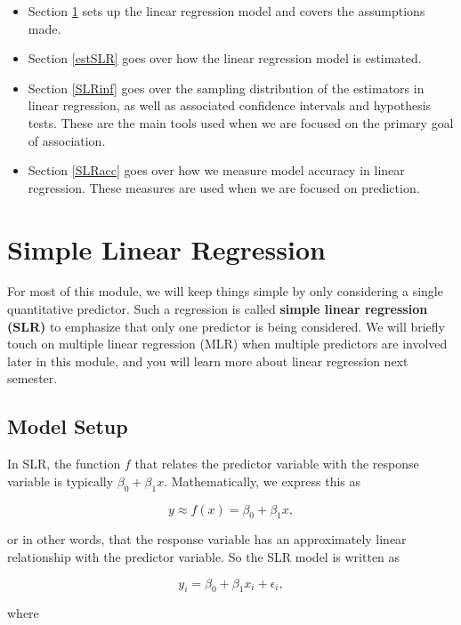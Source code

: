 \documentclass[
]{book}
\providecommand{\tightlist}{%
  \setlength{\itemsep}{0pt}\setlength{\parskip}{0pt}}
\begin{document}
\begin{itemize}
\tightlist
\item
  Section \ref{SLR} sets up the linear regression model and covers the assumptions made.
\item
  Section \ref{estSLR} goes over how the linear regression model is estimated.
\item
  Section \ref{SLRinf} goes over the sampling distribution of the estimators in linear regression, as well as associated confidence intervals and hypothesis tests. These are the main tools used when we are focused on the primary goal of association.
\item
  Section \ref{SLRacc} goes over how we measure model accuracy in linear regression. These measures are used when we are focused on prediction.
\end{itemize}

\hypertarget{SLR}{%
\section{Simple Linear Regression}\label{SLR}}

For most of this module, we will keep things simple by only considering a single quantitative predictor. Such a regression is called \textbf{simple linear regression (SLR)} to emphasize that only one predictor is being considered. We will briefly touch on multiple linear regression (MLR) when multiple predictors are involved later in this module, and you will learn more about linear regression next semester.

\hypertarget{model-setup}{%
\subsection{Model Setup}\label{model-setup}}

In SLR, the function \(f\) that relates the predictor variable with the response variable is typically \(\beta_0 + \beta_1 x\). Mathematically, we express this as

\[
y \approx f(x) = \beta_0 + \beta_1 x,
\]

or in other words, that the response variable has an approximately linear relationship with the predictor variable. So the SLR model is written as

\begin{equation} 
y_i=\beta_0+\beta_{1}x_i + \epsilon_i,
\label{eq:10-SLRmod}
\end{equation}

where
\end{document}
